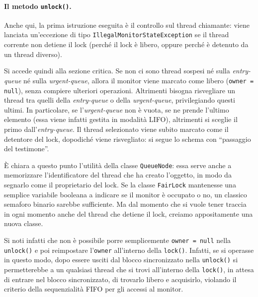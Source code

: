 \documentclass[a4paper,twoside]{article}
\newcommand\code{\lstinline[basicstyle=\normalsize\ttfamily]}
\begin{document}


\paragraph{Il metodo \texttt{unlock()}.}
Anche qui, la prima istruzione eseguita è il controllo sul thread chiamante: viene lanciata un'eccezione di tipo \code|IllegalMonitorStateException| se il thread corrente non detiene il lock (perché il lock è libero, oppure perché è detenuto da un thread diverso).

Si accede quindi alla sezione critica. Se non ci sono thread sospesi né sulla \emph{entry-queue} né sulla \emph{urgent-queue}, allora il monitor viene marcato come libero (\code|owner = null|), senza compiere ulteriori operazioni. Altrimenti bisogna risvegliare un thread tra quelli della \emph{entry-queue} o della \emph{urgent-queue}, privilegiando questi ultimi. In particolare, se l'\emph{urgent-queue} non è vuota, se ne prende l'ultimo elemento (essa viene infatti gestita in modalità LIFO), altrimenti si sceglie il primo dall'\emph{entry-queue}. Il thread selezionato viene subito marcato come il detentore del lock, dopodiché viene risvegliato: si segue lo schema con “passaggio del testimone”.

È chiara a questo punto l'utilità della classe \code|QueueNode|: essa serve anche a memorizzare l'identificatore del thread che ha creato l'oggetto, in modo da segnarlo come il proprietario del lock. Se la classe \code|FairLock| mantenesse una semplice variabile booleana a indicare se il monitor è occupato o no, un classico semaforo binario sarebbe sufficiente. Ma dal momento che si vuole tener traccia in ogni momento anche del thread che detiene il lock, creiamo appositamente una nuova classe.

Si noti infatti che non è possibile porre semplicemente \code|owner = null| nella \code|unlock()| e poi reimpostare l'\code|owner| all'interno della \code|lock()|. Infatti, se si operasse in questo modo, dopo essere usciti dal blocco sincronizzato nella \code|unlock()| si permetterebbe a un qualsiasi thread che si trovi all'interno della \code|lock()|, in attesa di entrare nel blocco sincronizzato, di trovarlo libero e acquisirlo, violando il criterio della sequenzialità FIFO per gli accessi al monitor.
\end{document}

